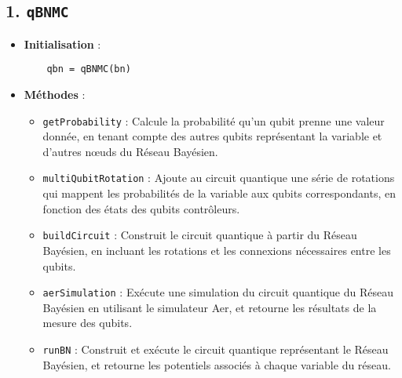 \subsection*{1. \texttt{qBNMC}}
\begin{itemize}
    \item \textbf{Initialisation} : 
    \begin{minipage}{\linewidth}
    \begin{lstlisting}
    qbn = qBNMC(bn)
    \end{lstlisting}
    \end{minipage}
    
    
    \item \textbf{Méthodes} :
    \begin{itemize}
        \item \texttt{getProbability} : Calcule la probabilité qu’un qubit prenne une valeur donnée, en tenant compte des autres qubits représentant la variable et d’autres nœuds du Réseau Bayésien.
        \item \texttt{multiQubitRotation} : Ajoute au circuit quantique une série de rotations qui mappent les probabilités de la variable aux qubits correspondants, en fonction des états des qubits contrôleurs.
        \item \texttt{buildCircuit} : Construit le circuit quantique à partir du Réseau Bayésien, en incluant les rotations et les connexions nécessaires entre les qubits.
        \item \texttt{aerSimulation} : Exécute une simulation du circuit quantique du Réseau Bayésien en utilisant le simulateur Aer, et retourne les résultats de la mesure des qubits.
        \item \texttt{runBN} : Construit et exécute le circuit quantique représentant le Réseau Bayésien, et retourne les potentiels associés à chaque variable du réseau.
    \end{itemize}
\end{itemize}

